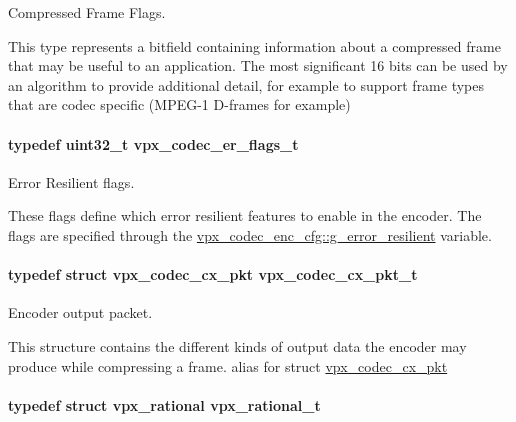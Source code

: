 \-Compressed \-Frame \-Flags. 

\-This type represents a bitfield containing information about a compressed frame that may be useful to an application. \-The most significant 16 bits can be used by an algorithm to provide additional detail, for example to support frame types that are codec specific (\-M\-P\-E\-G-\/1 \-D-\/frames for example) \hypertarget{group__encoder_ga77e0e1fff62556a4f4d54c84467a41f3}{
\paragraph[{vpx\-\_\-codec\-\_\-er\-\_\-flags\-\_\-t}]{\setlength{\rightskip}{0pt plus 5cm}typedef uint32\-\_\-t {\bf vpx\-\_\-codec\-\_\-er\-\_\-flags\-\_\-t}}}\label{group__encoder_ga77e0e1fff62556a4f4d54c84467a41f3}


\-Error \-Resilient flags. 

\-These flags define which error resilient features to enable in the encoder. \-The flags are specified through the \hyperlink{structvpx__codec__enc__cfg_a4e17173b66ca0d7dfba9978625d7ba76}{vpx\-\_\-codec\-\_\-enc\-\_\-cfg\-::g\-\_\-error\-\_\-resilient} variable. \hypertarget{group__encoder_ga3f711e17fbefac545e8959ef5a023556}{
\paragraph[{vpx\-\_\-codec\-\_\-cx\-\_\-pkt\-\_\-t}]{\setlength{\rightskip}{0pt plus 5cm}typedef struct {\bf vpx\-\_\-codec\-\_\-cx\-\_\-pkt}  {\bf vpx\-\_\-codec\-\_\-cx\-\_\-pkt\-\_\-t}}}\label{group__encoder_ga3f711e17fbefac545e8959ef5a023556}


\-Encoder output packet. 

\-This structure contains the different kinds of output data the encoder may produce while compressing a frame. alias for struct \hyperlink{structvpx__codec__cx__pkt}{vpx\-\_\-codec\-\_\-cx\-\_\-pkt} \hypertarget{group__encoder_ga2c08c6d71202024f17a5aef71a3d13e5}{
\paragraph[{vpx\-\_\-rational\-\_\-t}]{\setlength{\rightskip}{0pt plus 5cm}typedef struct {\bf vpx\-\_\-rational}  {\bf vpx\-\_\-rational\-\_\-t}}}\label{group__encoder_ga2c08c6d71202024f17a5aef71a3d13e5}


